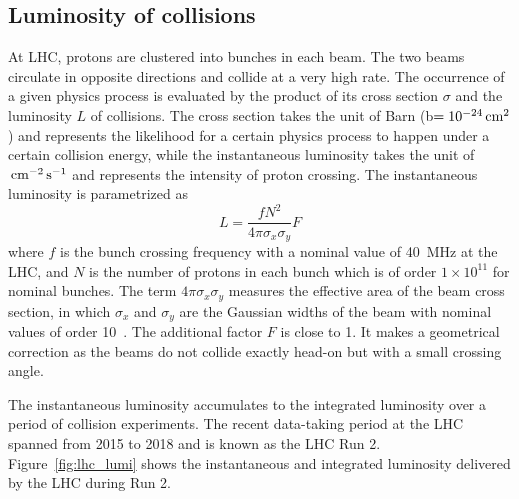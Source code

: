 \subsection{Luminosity of collisions}\label{sec:lumi}

At LHC, protons are clustered into bunches in each beam.
The two beams circulate in opposite directions and collide at a very high rate.
The occurrence of a given physics process is evaluated by the product of its cross section $\sigma$ and the luminosity $L$ of collisions.
The cross section takes the unit of Barn (b$ = 10^{-24} \,\text{cm}^{2}$) and represents the likelihood for a certain physics process to happen under a certain collision energy,
while the instantaneous luminosity takes the unit of $\,\text{cm}^{-2}\,\text{s}^{-1}$ and represents the intensity of proton crossing.
The instantaneous luminosity is parametrized as 
\begin{equation}\label{eq:luminosity_def}
    L = \frac{fN^{2}}{4\pi\sigma_{x}\sigma_{y}} F
\end{equation}
where $f$ is the bunch crossing frequency with a nominal value of 40~MHz at the LHC,
and $N$ is the number of protons in each bunch which is of order $1\times10^{11}$ for nominal bunches.
The term $4\pi\sigma_{x}\sigma_{y}$ measures the effective area of the beam cross section, 
in which $\sigma_{x}$ and $\sigma_{y}$ are the Gaussian widths of the beam with nominal values of order 10~\mum.
The additional factor $F$ is close to 1. 
It makes a geometrical correction as the beams do not collide exactly head-on but with a small crossing angle.

The instantaneous luminosity accumulates to the integrated luminosity over a period of collision experiments.
The recent data-taking period at the LHC spanned from 2015 to 2018 and is known as the LHC Run 2.
Figure~\ref{fig:lhc_lumi} shows the instantaneous and integrated luminosity delivered by the LHC during Run 2.

